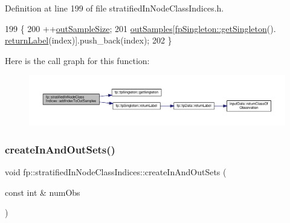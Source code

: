 Definition at line 199 of file stratified\+In\+Node\+Class\+Indices.\+h.


\begin{DoxyCode}
199                                                        \{
200                 ++\hyperlink{classfp_1_1stratifiedInNodeClassIndices_aa947b545e6751902344e832fcc1c9641}{outSampleSize};
201                 \hyperlink{classfp_1_1stratifiedInNodeClassIndices_aa569f727e65e0b4b0815e71c1ee819e8}{outSamples}[\hyperlink{classfp_1_1fpSingleton_a8bdae77b68521003e3fc630edec2e240}{fpSingleton::getSingleton}().
      \hyperlink{classfp_1_1fpSingleton_aa2f644b1521948fb994f4087ddfaea14}{returnLabel}(index)].push\_back(index);
202             \}
\end{DoxyCode}
Here is the call graph for this function\+:\nopagebreak
\begin{figure}[H]
\begin{center}
\leavevmode
\includegraphics[width=350pt]{classfp_1_1stratifiedInNodeClassIndices_adc99a046031545bc59c2b43abcf75ed9_cgraph}
\end{center}
\end{figure}
\mbox{\label{classfp_1_1stratifiedInNodeClassIndices_a64bc290a78f3800cef41d42ebe64ff1b}} 
\subsubsection{\texorpdfstring{create\+In\+And\+Out\+Sets()}{createInAndOutSets()}}
{\footnotesize\ttfamily void fp\+::stratified\+In\+Node\+Class\+Indices\+::create\+In\+And\+Out\+Sets (\begin{DoxyParamCaption}\item[{const int \&}]{num\+Obs }\end{DoxyParamCaption})\hspace{0.3cm}{\ttfamily [inline]}}



